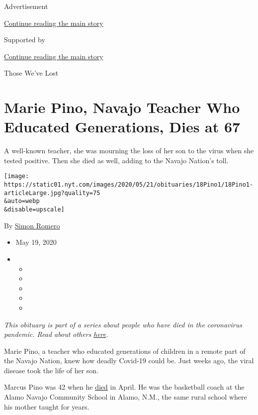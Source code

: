 Advertisement

\protect\hyperlink{after-top}{Continue reading the main story}

Supported by

\protect\hyperlink{after-sponsor}{Continue reading the main story}

Those We've Lost

\hypertarget{marie-pino-navajo-teacher-who-educated-generations-dies-at-67}{%
\section{Marie Pino, Navajo Teacher Who Educated Generations, Dies at
67}\label{marie-pino-navajo-teacher-who-educated-generations-dies-at-67}}

A well-known teacher, she was mourning the loss of her son to the virus
when she tested positive. Then she died as well, adding to the Navajo
Nation's toll.

\texttt{[image: https://static01.nyt.com/images/2020/05/21/obituaries/18Pino1/18Pino1-articleLarge.jpg?quality=75\\\&auto=webp\\\&disable=upscale]}

By \href{https://www.nytimes.com/by/simon-romero}{Simon Romero}

\begin{itemize}
\item
  May 19, 2020
\item
  \begin{itemize}
  \item
  \item
  \item
  \item
  \item
  \end{itemize}
\end{itemize}

\emph{This obituary is part of a series about people who have died in
the coronavirus pandemic. Read about others}
\href{https://www.nytimes.com/series/people-who-have-died-of-the-coronavirus}{\emph{here}}\emph{.}

Marie Pino, a teacher who educated generations of children in a remote
part of the Navajo Nation, knew how deadly Covid-19 could be. Just weeks
ago, the viral disease took the life of her son.

Marcus Pino was 42 when he
\href{https://www.abqjournal.com/1445029/alamo-navajo-hoops-coach-pino-dies-from-virus.html}{died}
in April. He was the basketball coach at the Alamo Navajo Community
School in Alamo, N.M., the same rural school where his mother taught for
years.

